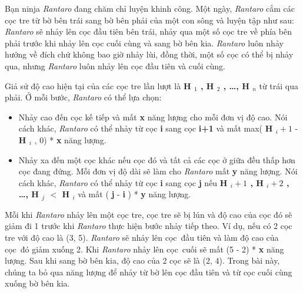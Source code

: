 



   Bạn ninja   \emph{    Rantaro   }   đang chăm chỉ luyện khinh công. Một ngày,   \emph{    Rantaro   }   cắm các cọc tre từ bờ bên trái sang bờ bên phải của một con sông và luyện tập như sau:   \emph{    Rantaro   }   sẽ nhảy lên cọc đầu tiên bên trái, nhảy qua một số cọc tre về phía bên phải trước khi nhảy lên cọc cuối cùng và sang bờ bên kia.   \emph{    Rantaro   }   luôn nhảy hướng về đích chứ không bao giờ nhảy lùi, đồng thời, một số cọc có thể bị nhảy qua, nhưng   \emph{    Rantaro   }   luôn nhảy lên cọc đầu tiên và cuối cùng.  

   Giả sử độ cao hiện tại của các cọc tre lần lượt là   \textbf{    H    $_     1    $    , H    $_     2    $    , …, H    $_     n    $}   từ trái qua phải. Ở mỗi bước,   \emph{    Rantaro   }   có thể lựa chọn:  
\begin{itemize}
	\item     Nhảy cao đến cọc kế tiếp và mất    \textbf{     x    }    năng lượng cho mỗi đơn vị độ cao. Nói cách khác,    \emph{     Rantaro    }    có thể nhảy từ cọc    \textbf{     i    }    sang cọc    \textbf{     i+1    }    và mất max(    \textbf{     H     $_      i+1     $}    -    \textbf{     H     $_      i     $}    , 0) *    \textbf{     x    }    năng lượng.   
	\item     Nhảy xa đến một cọc khác nếu cọc đó và tất cả các cọc ở giữa đều thấp hơn cọc đang đứng. Mỗi đơn vị độ dài sẽ làm cho    \emph{     Rantaro    }    mất    \textbf{     y    }    năng lượng. Nói cách khác,    \emph{     Rantaro    }    có thể nhảy từ cọc    \textbf{     i    }    sang cọc    \textbf{     j    }    nếu    \textbf{     H     \textbf{$_       i+1      $}     , H     $_      i+2     $     , …, H     $_      j     $     $<$ H     $_      i     $}    và mất (    \textbf{     j    }    -    \textbf{     i    }    ) *    \textbf{     y    }    năng lượng.   
\end{itemize}

   Mỗi khi   \emph{    Rantaro   }   nhảy lên một cọc tre, cọc tre sẽ bị lún và độ cao của cọc đó sẽ giảm đi 1 trước khi   \emph{    Rantaro   }   thực hiện bước nhảy tiếp theo. Ví dụ, nếu có 2 cọc tre với độ cao là (3, 5).   \emph{    Rantaro   }   sẽ nhảy lên cọc đầu tiên và làm độ cao của cọc đó giảm xuống 2. Khi   \emph{    Rantaro   }   nhảy lên cọc cuối sẽ mất (5 - 2) *   \textbf{    x   }   năng lượng. Sau khi sang bờ bên kia, độ cao của 2 cọc sẽ là (2, 4). Trong bài này, chúng ta bỏ qua năng lượng để nhảy từ bờ lên cọc đầu tiên và từ cọc cuối cùng xuống bờ bên kia.  

